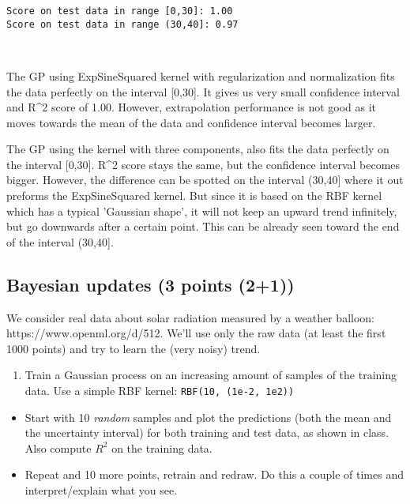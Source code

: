 \documentclass[11pt]{article}
\providecommand{\tightlist}{%
      \setlength{\itemsep}{0pt}\setlength{\parskip}{0pt}}
\begin{document}
    \begin{Verbatim}[commandchars=\\\{\}]
Score on test data in range [0,30]: 1.00
Score on test data in range (30,40]: 0.97

    \end{Verbatim}

    \begin{center}
    \end{center}
    { \hspace*{\fill} \\}
    
    The GP using ExpSineSquared kernel with regularization and normalization
fits the data perfectly on the interval {[}0,30{]}. It gives us very
small confidence interval and R\^{}2 score of 1.00. However,
extrapolation performance is not good as it moves towards the mean of
the data and confidence interval becomes larger.

The GP using the kernel with three components, also fits the data
perfectly on the interval {[}0,30{]}. R\^{}2 score stays the same, but
the confidence interval becomes bigger. However, the difference can be
spotted on the interval (30,40{]} where it out preforms the
ExpSineSquared kernel. But since it is based on the RBF kernel which has
a typical 'Gaussian shape', it will not keep an upward trend infinitely,
but go downwards after a certain point. This can be already seen toward
the end of the interval (30,40{]}.

    \subsection{Bayesian updates (3 points
(2+1))}\label{bayesian-updates-3-points-21}

We consider real data about solar radiation measured by a weather
balloon: https://www.openml.org/d/512. We'll use only the raw data (at
least the first 1000 points) and try to learn the (very noisy) trend.

    \begin{enumerate}
\def\labelenumi{\arabic{enumi}.}
\tightlist
\item
  Train a Gaussian process on an increasing amount of samples of the
  training data. Use a simple RBF kernel:
  \texttt{RBF(10,\ (1e-2,\ 1e2))}
\end{enumerate}

\begin{itemize}
\tightlist
\item
  Start with 10 \emph{random} samples and plot the predictions (both the
  mean and the uncertainty interval) for both training and test data, as
  shown in class. Also compute \(R^2\) on the training data.
\item
  Repeat and 10 more points, retrain and redraw. Do this a couple of
  times and interpret/explain what you see.
\end{itemize}
\end{document}
